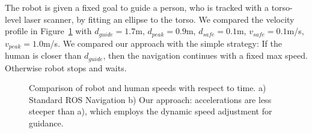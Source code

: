 The robot is given a fixed goal to guide a person, who is tracked with a torso-level laser scanner, by fitting an ellipse to the torso. We compared the velocity profile in Figure~\ref{fig:guidance_performance_graph} with $d_{guide}=1.7$m, $d_{peak}=0.9$m, $d_{safe}=0.1$m, $v_{safe}=0.1$m/s, $v_{peak}=1.0$m/s. We compared our approach with the simple strategy: If the human is closer than $d_{guide}$, then the navigation continues with a fixed max speed. Otherwise robot stops and waits.

\begin{figure}[ht!]
\centering
%
        
    \caption{%
	Comparison of robot and human speeds with respect to time. a) Standard ROS Navigation b) Our approach: accelerations are less steeper than a), which employs the dynamic speed adjustment for guidance.
     }%
   \label{fig:guidance_performance_graph}
\end{figure}

